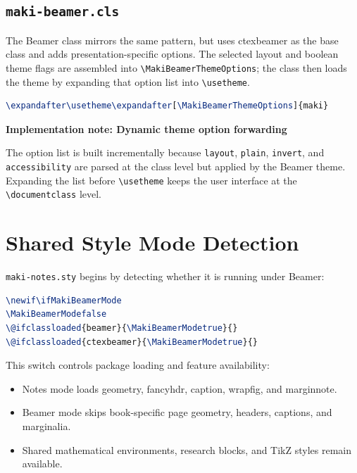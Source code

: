 \documentclass[a4paper,11pt]{ltxdoc}
\newcommand{\mfile}[1]{\texttt{#1}}
\newcommand{\mcls}[1]{\textsf{#1}}
\newcommand{\mpkg}[1]{\textsf{#1}}
\newcommand{\mopt}[1]{\texttt{#1}}
\newcommand{\mcmd}[1]{\texttt{\textbackslash#1}}
\newenvironment{implementation}[1]
  {\par\medskip\noindent\textbf{\color{MakiBlue}Implementation note: #1}\par\smallskip}
  {\par\medskip}
\begin{document}
\subsection{\mfile{maki-beamer.cls}}

The Beamer class mirrors the same pattern, but uses \mcls{ctexbeamer} as the base
class and adds presentation-specific options. The selected layout and boolean
theme flags are assembled into \mcmd{MakiBeamerThemeOptions}; the class then
loads the theme by expanding that option list into \mcmd{usetheme}.

\begin{lstlisting}[language=TeX]
\expandafter\usetheme\expandafter[\MakiBeamerThemeOptions]{maki}
\end{lstlisting}

\begin{implementation}{Dynamic theme option forwarding}
The option list is built incrementally because \mopt{layout}, \mopt{plain},
\mopt{invert}, and \mopt{accessibility} are parsed at the class level but applied
by the Beamer theme. Expanding the list before \mcmd{usetheme} keeps the user
interface at the \mcmd{documentclass} level.
\end{implementation}

\section{Shared Style Mode Detection}

\mfile{maki-notes.sty} begins by detecting whether it is running under Beamer:

\begin{lstlisting}[language=TeX]
\newif\ifMakiBeamerMode
\MakiBeamerModefalse
\@ifclassloaded{beamer}{\MakiBeamerModetrue}{}
\@ifclassloaded{ctexbeamer}{\MakiBeamerModetrue}{}
\end{lstlisting}

This switch controls package loading and feature availability:

\begin{itemize}
\item Notes mode loads \mpkg{geometry}, \mpkg{fancyhdr}, \mpkg{caption}, \mpkg{wrapfig}, and \mpkg{marginnote}.
\item Beamer mode skips book-specific page geometry, headers, captions, and marginalia.
\item Shared mathematical environments, research blocks, and TikZ styles remain available.
\end{itemize}
\end{document}
